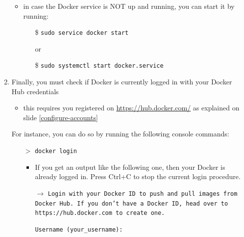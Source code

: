 \documentclass[handout]{beamer}\mode<presentation>{\usetheme{AMSCesenaBleu}}
\begin{document}
\begin{frame}[allowframebreaks]
\begin{enumerate}
\begin{itemize}
		\item in case the Docker service is NOT up and running, you can start it by running:
		
		\begin{itemize}
			\item[\$] \texttt{\alert{sudo} service docker start}
			\item[] or
			\item[\$] \texttt{\alert{sudo} systemctl start docker.service}
		\end{itemize}
	\end{itemize}
    
    \framebreak
    
    \item Finally, you must check if Docker is currently logged in with your Docker Hub credentials
    \begin{itemize}
    	\item this requires you registered on \url{https://hub.docker.com/} as explained on slide \ref{configure-accounts}
    \end{itemize}
    \vspace{.5cm}
    For instance, you can do so by running the following console commands:
    \begin{itemize}
        \item[$>$] \texttt{docker login}
        \begin{itemize}
            \item If you get an output like the following one, then your Docker is already logged in. 
            Press \alert{Ctrl+C} to stop the current login procedure.
            
            \vspace{.3cm}
            
            \item[$\rightarrow$] \texttt{Login with your Docker ID to push and pull images from Docker Hub. If you don't have a Docker ID, head over to https://hub.docker.com to create one.}
            \item[] \texttt{Username (\alert{your\_username}):}
            
            \vspace{.3cm}
            

\end{itemize}
\end{itemize}
\end{enumerate}
\end{frame}
\end{document}
